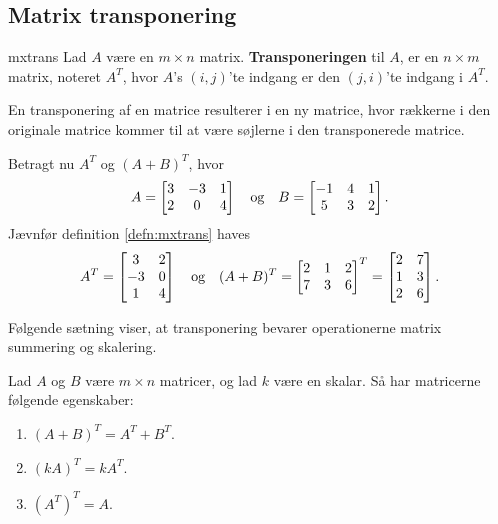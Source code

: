 \subsection{Matrix transponering}
\begin{defn}{}{mxtrans}
Lad $A$ være en $m \times n$ matrix. \textbf{Transponeringen} til $A$, er en $n \times m$ matrix, noteret $A^T$, hvor $A$'s $(i,j)$'te indgang er den $(j,i)$'te indgang i $A^T$.
\end{defn}
En transponering af en matrice resulterer i en ny matrice, hvor rækkerne i den originale matrice kommer til at være søjlerne i den transponerede matrice.

\begin{eks}\label{eks:trans}
Betragt nu $A^T$ og $(A+B)^T$, hvor 
\begin{align*}
A= 
\begin{bmatrix}
3	&	-3	&	1\\
2	&	0	&	4
\end{bmatrix}
\text{\phantom{---}og\phantom{---}}
B= 
\begin{bmatrix}
-1	&	4	&	1\\
5	&	3	&	2
\end{bmatrix}.
\end{align*}
Jævnfør definition \ref{defn:mxtrans} haves
\begin{align*}
A^T =
\begin{bmatrix}
3	&	2\\
-3	&	0\\
1	&	4
\end{bmatrix}
\text{\phantom{---}og\phantom{---}}
(A+B)^T=
\begin{bmatrix}
2	&	1	&	2\\
7	&	3	&	6
\end{bmatrix}^T
=
\begin{bmatrix}
2	&	7\\
1	&	3\\
2	&	6
\end{bmatrix}.
\end{align*}
\end{eks}

Følgende sætning viser, at transponering bevarer operationerne matrix summering og skalering.
\begin{thm}{}{}
Lad $A$ og $B$ være $m \times n$ matricer, og lad $k$ være en skalar.
Så har matricerne følgende egenskaber:
\begin{enumerate}[label=(\alph*)]
\item $(A + B)^T = A^T + B^T$.
\item $(kA)^T = kA^T$.
\item $(A^T)^T = A$.
\end{enumerate}
\end{thm}

